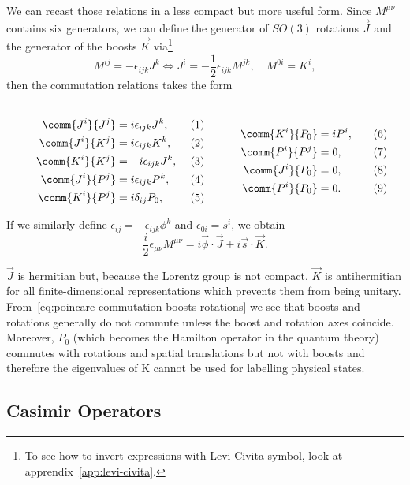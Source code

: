 We can recast those relations in a less compact but more useful form. Since $M^{\mu\nu}$ contains six generators, we can define the generator of $SO(3)$ rotations $\vec{J}$ and the generator of the boosts $\vec{K}$ via\footnote{To see how to invert expressions with Levi-Civita symbol, look at apprendix~\ref{app:levi-civita}.}
\begin{equation}\label{eq:poincare-boosts-rotations}
    M^{ij} = - \epsilon_{ijk} J^k \iff J^i =- \frac{1}{2} \epsilon_{ijk} M^{jk}, \quad M^{0i} = K^i, 
\end{equation}
then the commutation relations takes the form

\begin{subequations}
\label{eq:poincare-commutation-boosts-rotations}
\noindent\centering
    \begin{minipage}{0.48\textwidth}
        \begin{align}
        \comm{J^i}{J^j} &= i \epsilon_{ijk} J^k, \\
        \comm{J^i}{K^j} &= i \epsilon_{ijk} K^k ,\\
        \comm{K^i}{K^j} &= -i \epsilon_{ijk} J^k, \\
        \comm{J^i}{P^j} &= i \epsilon_{ijk} P^k ,\\
        \comm{K^i}{P^j} &= i \delta_{ij} P_0,
        \end{align}
    \end{minipage}
    \hfill
    \begin{minipage}{0.48\textwidth}
    \label{eq:bell_states}
        \begin{align}
        \comm{K^i}{P_0} &= i P^i ,\\
        \comm{P^i}{P^j} &= 0, \\
        \comm{J^i}{P_0} &= 0, \\
        \comm{P^i}{P_0} &= 0 .
        \end{align}
    \end{minipage}\bigskip
    \end{subequations}

If we similarly define $\epsilon_{ij} = - \epsilon_{ijk} \phi^k$ and $\epsilon_{0i} = s^i$, we obtain
\begin{equation}
    \frac{i}{2} \epsilon_{\mu\nu} M^{\mu\nu} = i \vec{\phi} \cdot \vec{J} + i \vec{s} \cdot \vec{K}.
\end{equation}

$\vec{J}$ is hermitian but, because the Lorentz group is not compact, $\vec{K}$ is antihermitian for all finite-dimensional representations which prevents them from being unitary. From~\eqref{eq:poincare-commutation-boosts-rotations} we see that boosts and rotations generally do not commute unless the boost and rotation axes coincide. Moreover, $P_0$ (which becomes the Hamilton operator in the quantum theory) commutes with rotations and spatial translations but not with boosts and therefore the eigenvalues of K cannot be used for labelling physical states.


\subsection{Casimir Operators}